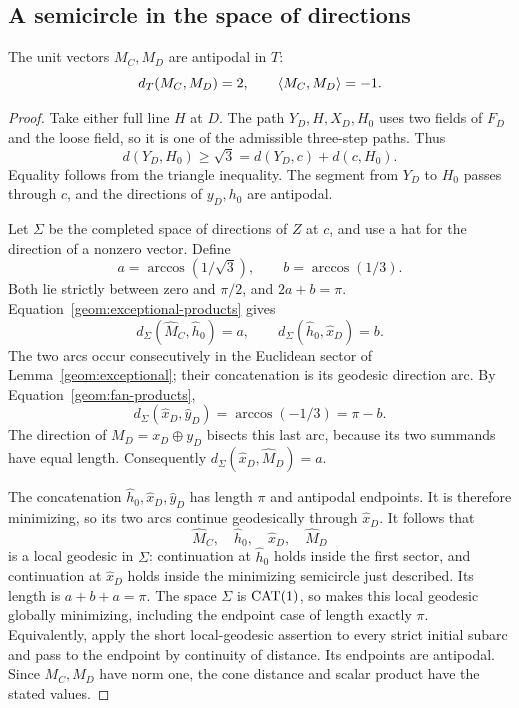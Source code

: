 \subsection{A semicircle in the space of directions}

\begin{lemma}
\label{geom:antipodal}
The unit vectors $M_C,M_D$ are antipodal in $T$:
\[
 d_T(M_C,M_D)=2,\qquad \langle M_C,M_D\rangle=-1.
\]
\end{lemma}

\begin{proof}
Take either full line $H$ at $D$.  The path
$Y_D,H,X_D,H_0$ uses two fields of $F_D$ and the loose field, so it is
one of the admissible three-step paths.  Thus
\[
 d(Y_D,H_0)\geq\sqrt3=d(Y_D,c)+d(c,H_0).
\]
Equality follows from the triangle inequality.  The segment from
$Y_D$ to $H_0$ passes through $c$, and the directions of $y_D,h_0$
are antipodal.

Let $\Sigma$ be the completed space of directions of $Z$ at $c$, and
use a hat for the direction of a nonzero vector.  Define
\[
 a=\arccos(1/\sqrt3),\qquad b=\arccos(1/3).
\]
Both lie strictly between zero and $\pi/2$, and $2a+b=\pi$.
Equation~\eqref{geom:exceptional-products} gives
\[
 d_\Sigma(\widehat M_C,\widehat h_0)=a,
 \qquad d_\Sigma(\widehat h_0,\widehat x_D)=b.
\]
The two arcs occur consecutively in the Euclidean sector of
Lemma~\ref{geom:exceptional}; their concatenation is its geodesic
direction arc.  By Equation~\eqref{geom:fan-products},
\[
 d_\Sigma(\widehat x_D,\widehat y_D)=\arccos(-1/3)=\pi-b.
\]
The direction of $M_D=x_D\oplus y_D$ bisects this last arc, because
its two summands have equal length.  Consequently
$d_\Sigma(\widehat x_D,\widehat M_D)=a$.

The concatenation
$\widehat h_0,\widehat x_D,\widehat y_D$ has length $\pi$ and
antipodal endpoints.  It is therefore minimizing, so its two arcs
continue geodesically through $\widehat x_D$.  It follows that
\[
 \widehat M_C,\quad\widehat h_0,\quad\widehat x_D,
 \quad\widehat M_D
\]
is a local geodesic in $\Sigma$: continuation at $\widehat h_0$
holds inside the first sector, and continuation at $\widehat x_D$
holds inside the minimizing semicircle just described.  Its length
is $a+b+a=\pi$.  The space $\Sigma$ is $\operatorname{CAT}(1)$, so
\cite[Proposition~II.1.4(2)]{BH1999} makes this local geodesic
globally minimizing, including the endpoint case of length exactly
$\pi$.  Equivalently, apply the short local-geodesic assertion to
every strict initial subarc and pass to the endpoint by continuity
of distance.  Its endpoints are antipodal.  Since $M_C,M_D$ have norm
one, the cone distance and scalar product have the stated values.
\end{proof}

